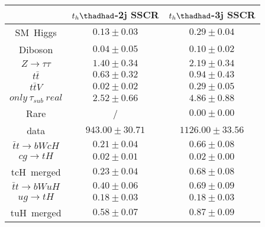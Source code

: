 \centering
\begin{tabular}{|c|c|c|} \hline
 & $t_{h}\thadhad$-2j SSCR & $t_{h}\thadhad$-3j SSCR \\\hline
SM~Higgs & $0.13\pm0.03$ & $0.29\pm0.04$\\\hline
Diboson & $0.04\pm0.05$ & $0.10\pm0.02$\\\hline
$Z\to\tau\tau$ & $1.40\pm0.34$ & $2.19\pm0.34$\\\hline
$t\bar{t}$ & $0.63\pm0.32$ & $0.94\pm0.43$\\\hline
$t\bar{t}V$ & $0.02\pm0.02$ & $0.29\pm0.05$\\\hline
$only~\tau_{sub}~real$ & $2.52\pm0.66$ & $4.86\pm0.88$\\\hline
Rare &  / & $0.00\pm0.00$\\\hline
data & $943.00\pm30.71$ & $1126.00\pm33.56$\\\hline
$\bar{t}t\to bWcH$ & $0.21\pm0.04$ & $0.66\pm0.08$\\\hline
$cg\to tH$ & $0.02\pm0.01$ & $0.02\pm0.00$\\\hline
tcH~merged & $0.23\pm0.04$ & $0.68\pm0.08$\\\hline
$\bar{t}t\to bWuH$ & $0.40\pm0.06$ & $0.69\pm0.09$\\\hline
$ug\to tH$ & $0.18\pm0.03$ & $0.18\pm0.03$\\\hline
tuH~merged & $0.58\pm0.07$ & $0.87\pm0.09$\\\hline
\end{tabular}

